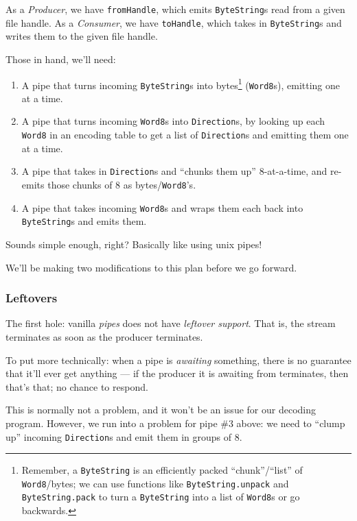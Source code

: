 \documentclass[]{article}
\begin{document}
As a \emph{Producer}, we have \texttt{fromHandle}, which emits
\texttt{ByteString}s read from a given file handle. As a \emph{Consumer}, we
have \texttt{toHandle}, which takes in \texttt{ByteString}s and writes them to
the given file handle.

Those in hand, we'll need:

\begin{enumerate}
\def\labelenumi{\arabic{enumi}.}
\tightlist
\item
  A pipe that turns incoming \texttt{ByteString}s into bytes\footnote{Remember,
    a \texttt{ByteString} is an efficiently packed ``chunk''/``list'' of
    \texttt{Word8}/bytes; we can use functions like \texttt{ByteString.unpack}
    and \texttt{ByteString.pack} to turn a \texttt{ByteString} into a list of
    \texttt{Word8}s or go backwards.} (\texttt{Word8}s), emitting one at a time.
\item
  A pipe that turns incoming \texttt{Word8}s into \texttt{Direction}s, by
  looking up each \texttt{Word8} in an encoding table to get a list of
  \texttt{Direction}s and emitting them one at a time.
\item
  A pipe that takes in \texttt{Direction}s and ``chunks them up'' 8-at-a-time,
  and re-emits those chunks of 8 as bytes/\texttt{Word8}'s.
\item
  A pipe that takes incoming \texttt{Word8}s and wraps them each back into
  \texttt{ByteString}s and emits them.
\end{enumerate}

Sounds simple enough, right? Basically like using unix pipes!

We'll be making two modifications to this plan before we go forward.

\subsubsection{Leftovers}\label{leftovers}

The first hole: vanilla \emph{pipes} does not have \emph{leftover support}. That
is, the stream terminates as soon as the producer terminates.

To put more technically: when a pipe is \emph{awaiting} something, there is no
guarantee that it'll ever get anything --- if the producer it is awaiting from
terminates, then that's that; no chance to respond.

This is normally not a problem, and it won't be an issue for our decoding
program. However, we run into a problem for pipe \#3 above: we need to ``clump
up'' incoming \texttt{Direction}s and emit them in groups of 8.
\end{document}

